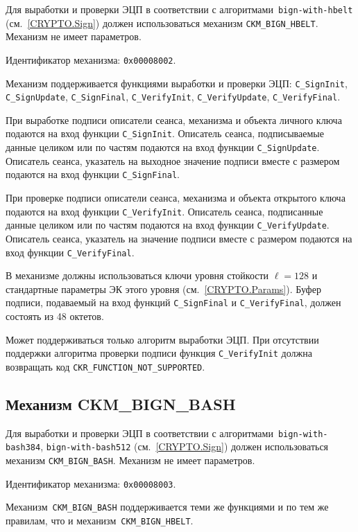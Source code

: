 Для выработки и проверки ЭЦП в соответствии с 
алгоритмами~\texttt{bign-with-hbelt} (см.~\ref{CRYPTO.Sign}) должен 
использоваться механизм \verb|CKM_BIGN_HBELT|.
%
Механизм не имеет параметров.

Идентификатор механизма: \texttt{0x00008002}.

Механизм поддерживается функциями выработки и проверки ЭЦП: 
\verb|C_SignInit|, \verb|C_SignUpdate|, \verb|C_SignFinal|, 
\verb|C_VerifyInit|, \verb|C_VerifyUpdate|, \verb|C_VerifyFinal|.

При выработке подписи описатели сеанса, механизма и объекта
личного ключа подаются на вход функции \verb|C_SignInit|.
Описатель сеанса, подписываемые данные целиком или по частям
подаются на вход функции \verb|C_SignUpdate|.
Описатель сеанса, указатель на выходное значение подписи вместе с размером
подаются на вход функции \verb|C_SignFinal|.

При проверке подписи описатели сеанса, механизма и объекта
открытого ключа подаются на вход функции \verb|C_VerifyInit|.
Описатель сеанса, подписанные данные целиком или по частям подаются
на вход функции \verb|C_VerifyUpdate|.
Описатель сеанса, указатель на значение подписи вместе с размером
подаются на вход функции \verb|C_VerifyFinal|.

В механизме должны использоваться ключи уровня стойкости $\ell=128$ 
и стандартные параметры ЭК этого уровня (см.~\ref{CRYPTO.Params}).
% 
Буфер подписи, подаваемый на вход функций \verb|C_SignFinal| и 
\verb|C_VerifyFinal|, должен состоять из 48 октетов.

Может поддерживаться только алгоритм выработки ЭЦП.
При отсутствии поддержки алгоритма проверки подписи
функция \verb|C_VerifyInit| должна возвращать код 
\verb|CKR_FUNCTION_NOT_SUPPORTED|.

\subsection{Механизм CKM\_BIGN\_BASH}\label{CRYPTOKI.SignBash}

Для выработки и проверки ЭЦП в соответствии с 
алгоритмами~\texttt{bign-with-bash384}, \texttt{bign-with-bash512} 
(см.~\ref{CRYPTO.Sign}) должен использоваться механизм 
\verb|CKM_BIGN_BASH|.
%
Механизм не имеет параметров.

Идентификатор механизма: \texttt{0x00008003}.

Механизм~\verb|CKM_BIGN_BASH| поддерживается теми же функциями и по тем же 
правилам, что и механизм~\verb|CKM_BIGN_HBELT|.

